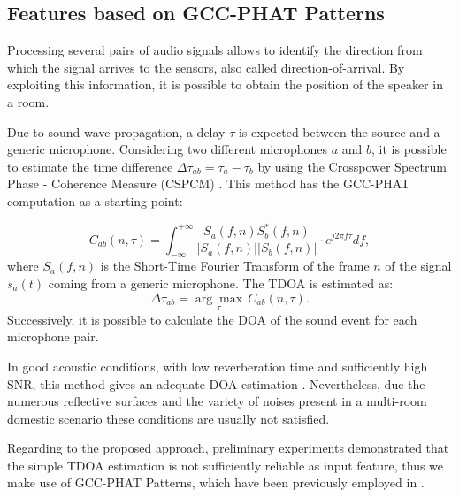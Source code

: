 \documentclass[review]{elsarticle}
\begin{document}
\subsection{Features based on GCC-PHAT Patterns}
\label{sec:features}

Processing several pairs of audio signals allows to identify the direction from which the signal arrives to the sensors, also called direction-of-arrival. By exploiting this information, it is possible to obtain the position of the speaker in a room. 

Due to sound wave propagation, a delay $\tau$ is expected between the source and a generic microphone. Considering two different microphones $a$ and $b$, it is possible to estimate the time difference $\Delta\tau_{ab} = \tau_a -\tau_b$ by using the Crosspower Spectrum Phase - Coherence Measure (CSPCM) \cite{knapp1976generalized}. %
This method has the GCC-PHAT computation as a starting point:

\begin{equation}
\label{eq:CSPCM}
C_{ab}(n,\tau) =  \int_{-\infty}^{+\infty}{\frac{S_a(f,n) S_b^*(f,n)}{|S_a(f,n)| |S_b(f,n)|} \cdot e^{j2 \pi f \tau} df },
\end{equation}
where $S_a(f,n)$ is the Short-Time Fourier Transform of the frame $n$ of the signal $s_a(t)$ coming from a generic microphone. The TDOA is estimated as:
\begin{equation}
\Delta\tau_{ab} = \underset{\tau}{\arg \max}\, C_{ab}(n,\tau).
\end{equation}
Successively, it is possible to calculate the DOA of the sound event for each microphone pair. 

In good acoustic conditions, with low reverberation time and sufficiently high SNR, this method gives an adequate DOA estimation \cite{zhang2008Phat}.
Nevertheless, due the numerous reflective surfaces and the variety of noises present in a multi-room domestic scenario these conditions are usually not satisfied.

Regarding to the proposed approach, preliminary experiments demonstrated that the simple TDOA estimation is not sufficiently reliable as input feature, thus we make use of GCC-PHAT Patterns, which have been previously employed in \cite{xiao2015learning}.
\end{document}
